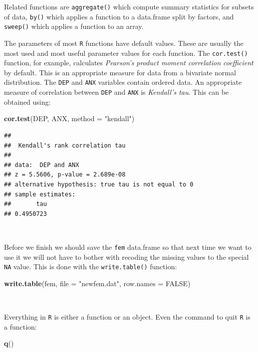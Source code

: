 \documentclass[12pt,a4paper]{book}
\newenvironment{Shaded}{\begin{snugshade}}{\end{snugshade}}
\newcommand{\KeywordTok}[1]{\textcolor[rgb]{0.13,0.29,0.53}{\textbf{#1}}}
\newcommand{\DataTypeTok}[1]{\textcolor[rgb]{0.13,0.29,0.53}{#1}}
\newcommand{\StringTok}[1]{\textcolor[rgb]{0.31,0.60,0.02}{#1}}
\newcommand{\OtherTok}[1]{\textcolor[rgb]{0.56,0.35,0.01}{#1}}
\newcommand{\NormalTok}[1]{#1}
\theoremstyle{definition}
\theoremstyle{definition}
\theoremstyle{definition}
\theoremstyle{remark}
\begin{document}
Related functions are \texttt{aggregate()} which compute summary
statistics for subsets of data, \texttt{by()} which applies a function
to a data.frame split by factors, and \texttt{sweep()} which applies a
function to an array.

The parameters of most \texttt{R} functions have default values. These
are usually the most used and most useful parameter values for each
function. The \texttt{cor.test()} function, for example, calculates
\emph{Pearson's product moment correlation coefficient} by default. This
is an appropriate measure for data from a bivariate normal distribution.
The \texttt{DEP} and \texttt{ANX} variables contain ordered data. An
appropriate measure of correlation between \texttt{DEP} and \texttt{ANX}
is \emph{Kendall's tau}. This can be obtained using:

\begin{Shaded}
\begin{Highlighting}[]
\KeywordTok{cor.test}\NormalTok{(DEP, ANX, }\DataTypeTok{method =} \StringTok{"kendall"}\NormalTok{)}
\end{Highlighting}
\end{Shaded}

\begin{verbatim}
## 
##  Kendall's rank correlation tau
## 
## data:  DEP and ANX
## z = 5.5606, p-value = 2.689e-08
## alternative hypothesis: true tau is not equal to 0
## sample estimates:
##       tau 
## 0.4950723
\end{verbatim}

~

Before we finish we should save the \texttt{fem} data.frame so that next
time we want to use it we will not have to bother with recoding the
missing values to the special \texttt{NA} value. This is done with the
\texttt{write.table()} function:

\begin{Shaded}
\begin{Highlighting}[]
\KeywordTok{write.table}\NormalTok{(fem, }\DataTypeTok{file =} \StringTok{"newfem.dat"}\NormalTok{, }\DataTypeTok{row.names =} \OtherTok{FALSE}\NormalTok{)}
\end{Highlighting}
\end{Shaded}

~

Everything in \texttt{R} is either a function or an object. Even the
command to quit \texttt{R} is a function:

\begin{Shaded}
\begin{Highlighting}[]
\KeywordTok{q}\NormalTok{()}
\end{Highlighting}
\end{Shaded}
\end{document}
